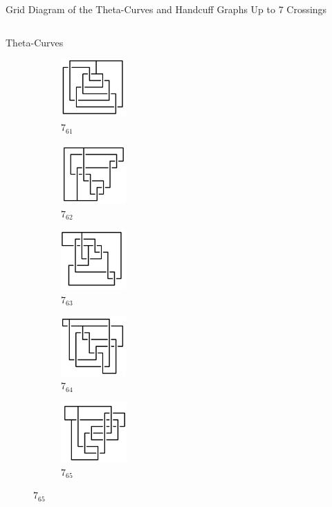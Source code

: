 \documentclass[final]{beamer}
\begin{document}
\begin{frame}[t]
\begin{alertblock}{Grid Diagram of the Theta-Curves and Handcuff Graphs Up to 7 Crossings}
\begin{columns}[t]
\begin{column}{0.7\textwidth}
\begin{alertblock}{Theta-Curves}
\begin{figure}
\begin{subfigure}{0.075\textwidth}
    \end{subfigure}
    \begin{subfigure}{0.075\textwidth}
    \includegraphics[width=2.5cm]{../Midterm_Poster/grid_diagram/theta_7_61.png}
    \caption{$7_{61}$} 
    \end{subfigure}
    \begin{subfigure}{0.075\textwidth}
    \includegraphics[width=2.5cm]{../Midterm_Poster/grid_diagram/theta_7_62.png}
    \caption{$7_{62}$} 
    \end{subfigure}
    \begin{subfigure}{0.075\textwidth}
    \includegraphics[width=2.5cm]{../Midterm_Poster/grid_diagram/theta_7_63.png}
    \caption{$7_{63}$} 
    \end{subfigure}
    \begin{subfigure}{0.075\textwidth}
    \includegraphics[width=2.5cm]{../Midterm_Poster/grid_diagram/theta_7_64.png}
    \caption{$7_{64}$} 
    \end{subfigure}
    \begin{subfigure}{0.075\textwidth}
    \includegraphics[width=2.5cm]{../Midterm_Poster/grid_diagram/theta_7_65.png}
    \caption{$7_{65}$} 
    \end{subfigure}
  \end{figure}



\end{alertblock}
\end{column}
\end{columns}
\end{alertblock}
\end{frame}
\end{document}
